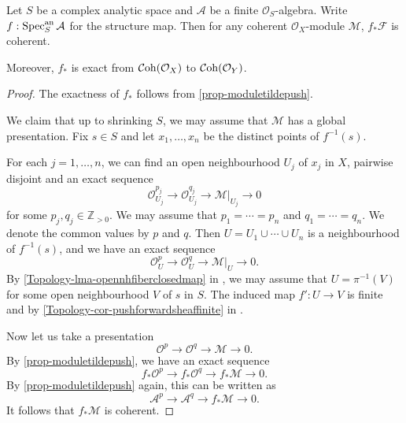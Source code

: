\begin{corollary}\label{cor-specpushcohiscoh}
    Let $S$ be a complex analytic space and $\mathcal{A}$ be a finite $\mathcal{O}_S$-algebra. Write $f:\operatorname{Spec}^{\mathrm{an}}_S \mathcal{A}$ for the structure map. Then for any coherent $\mathcal{O}_X$-module $\mathcal{M}$, $f_*\mathcal{F}$ is coherent.

    Moreover, $f_*$ is exact from $\mathcal{C}\mathrm{oh}(\mathcal{O}_X)$ to
    $\mathcal{C}\mathrm{oh}(\mathcal{O}_Y)$.
\end{corollary}
\begin{proof}
    The exactness of $f_*$ follows from \cref{prop-moduletildepush}.

    We claim that up to shrinking $S$, we may assume that $\mathcal{M}$ has a global presentation. Fix $s\in S$ and let $x_1,\ldots,x_n$ be the distinct points of $f^{-1}(s)$.
    
    For each $j=1,\ldots,n$, we can find an open neighbourhood $U_j$ of $x_j$ in $X$, pairwise disjoint and an exact sequence 
    \[
        \mathcal{O}_{U_j}^{p_j}\rightarrow \mathcal{O}_{U_j}^{q_j}\rightarrow \mathcal{M}|_{U_j}\rightarrow 0
    \]
    for some $p_j,q_j\in \mathbb{Z}_{>0}$.  We may assume that $p_1=\cdots=p_n$ and $q_1=\cdots=q_n$. We denote the common values by $p$ and $q$. Then $U=U_1\cup\cdots\cup U_n$ is a neighbourhood of $f^{-1}(s)$, and we have an exact sequence 
    \[
        \mathcal{O}_{U}^{p}\rightarrow \mathcal{O}_{U}^{q}\rightarrow \mathcal{M}|_{U}\rightarrow 0.
    \]
    By \cref{Topology-lma-opennhfiberclosedmap} in ,
    we may assume that $U=\pi^{-1}(V)$ for some open neighbourhood $V$ of $s$ in $S$. The induced map $f':U\rightarrow V$ is finite and by \cref{Topology-cor-pushforwardsheaffinite} in .

    Now let us take a presentation
    \[
        \mathcal{O}^{p}\rightarrow \mathcal{O}^{q}\rightarrow \mathcal{M}\rightarrow 0.
    \]
    By \cref{prop-moduletildepush}, we have an exact sequence
    \[
        f_*  \mathcal{O}^{p}\rightarrow f_* \mathcal{O}^{q}\rightarrow f_* \mathcal{M}\rightarrow 0.
    \]
    By \cref{prop-moduletildepush} again, this can be written as
    \[
        \mathcal{A}^p\rightarrow \mathcal{A}^q\rightarrow   f_* \mathcal{M}\rightarrow 0.
    \]
    It follows that $f_*\mathcal{M}$ is coherent.
\end{proof}

